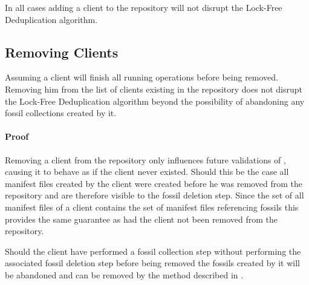 In all cases adding a client to the repository will not disrupt the Lock-Free
Deduplication algorithm.

\subsection{Removing Clients}\label{sec:removing-clients}

\begin{thm}\label{thm:removing-clients}
    Assuming a client will finish all running operations before being removed.
    Removing him from the list of clients existing in the repository does not
    disrupt the Lock-Free Deduplication algorithm beyond the possibility of
    abandoning any fossil collections created by it.
\end{thm}

\paragraph{Proof} Removing a client from the repository only influences future
validations of , causing it to behave as if the client
never existed.
Should this be the case all manifest files created by the client were created
before he was removed from the repository and are therefore visible to the
fossil deletion step.
Since the set of all manifest files of a client contains the set of manifest
files referencing fossils this provides the same guarantee as 
had the client not been removed from the repository.

Should the client have performed a fossil collection step without performing the
associated fossil deletion step before being removed the fossils created by it
will be abandoned and can be removed by the method described in .
